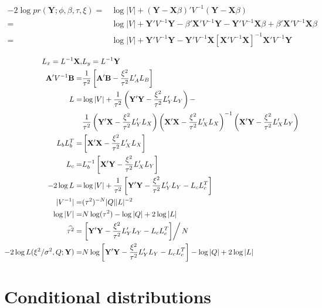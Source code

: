 \documentclass[12pt]{article}
\begin{document}
\begin{align*}
-2 \log pr(\mathbf{Y};\phi,\beta,\tau,\xi) =&
\log| V| + 
( \mathbf{Y} -\mathbf{X}\beta)  '
  V^{-1}
(\mathbf{Y} - \mathbf{X}\beta)\\
=&\log| V| +  \mathbf{Y}' V^{-1} \mathbf{Y} -\beta' \mathbf{X}' V^{-1} \mathbf{Y} - \mathbf{Y}' V^{-1} \mathbf{X}\beta +  \beta'\mathbf{X}'
 V^{-1}   \mathbf{X}\beta
\\
= & \log| V| +
 \mathbf{Y}' V^{-1} \mathbf{Y}  -  \mathbf{Y}'  V^{-1}   \mathbf{X}[ \mathbf{X}'
 V^{-1}   \mathbf{X}]^{-1}\mathbf{X}' V^{-1} \mathbf{Y}
\end{align*}

\begin{align*}
L_x = L^{-1} \mathbf{X}, & L_y = L^{-1}\mathbf{Y}\\
 \mathbf{A}' V^{-1} \mathbf{B}  = &  \frac{1}{\tau^2} \left[ \mathbf{A}' \mathbf{B} - \frac{\xi^2 }{\tau^2}  L_A' L_B \right] \\
 L=&  \log| V| + \frac{1}{\tau^2}\left( \mathbf{Y}' \mathbf{Y} - \frac{\xi^2 }{\tau^2}  L_Y' L_Y \right) -\\ 
&\frac{1}{\tau^2} \left( \mathbf{Y}' \mathbf{X} - \frac{\xi^2 }{\tau^2}  L_Y' L_X\right)  
\left(  \mathbf{X}' \mathbf{X} - \frac{\xi^2 }{\tau^2}  L_X' L_X \right)^{-1}
\left( \mathbf{X}' \mathbf{Y} - \frac{\xi^2 }{\tau^2}  L_X' L_Y \right)\\
L_b L_b^T = &\left[  \mathbf{X}' \mathbf{X} - \frac{\xi^2 }{\tau^2} L_X' L_X \right] \\
L_c = & L_b^{-1} \left[  \mathbf{X}' \mathbf{Y} -\frac{\xi^2 }{\tau^2}  L_X' L_Y \right]\\
-2 \log L = & \log| V| +	\frac{1}{\tau^2} \left[\mathbf{Y}' \mathbf{Y}- \frac{\xi^2 }{\tau^2}  L_Y' L_Y-L_c L_c^T\right]   \\
|V^{-1}| = & ( \tau^2 )^{-N} |Q|  |L|^{-2} \\
 \log| V| = & N \log(\tau^2) - \log |Q| + 2 \log |L| \\
 \widehat{\tau^2} =&\left. \left[\mathbf{Y}' \mathbf{Y}- \frac{\xi^2 }{\tau^2}  L_Y' L_Y-L_c L_c^T\right]\right/N \\
-2 \log L (\xi^2/\sigma^2,Q;\mathbf{Y})= &N \log\left[\mathbf{Y}' \mathbf{Y}- \frac{\xi^2 }{\tau^2}  L_Y' L_Y-L_c L_c^T\right]  - \log |Q| + 2 \log |L|
 \end{align*}


\section*{Conditional distributions}
\end{document}
